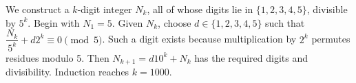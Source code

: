 We construct a $k$-digit integer $N_k$, all of whose digits lie in $\{1,2,3,4,5\}$, divisible by $5^k$. Begin with $N_1=5$. Given $N_k$, choose $d\in\{1,2,3,4,5\}$ such that $\dfrac{N_k}{5^k}+d2^k\equiv0\pmod5$. Such a digit exists because multiplication by $2^k$ permutes residues modulo 5. Then $N_{k+1}=d10^k+N_k$ has the required digits and divisibility. Induction reaches $k=1000$.
